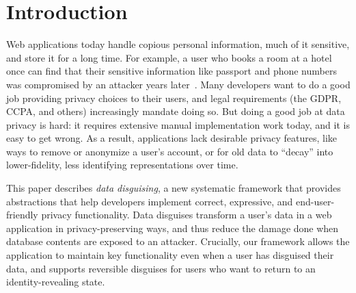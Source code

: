 \section{Introduction}
\label{s:intro}

%
Web applications today handle copious personal information, much of it
sensitive, and store it for a long time.
%
For example, a user who books a room at a hotel once can find that their
sensitive information like passport and phone numbers was compromised by
an attacker years later~\cite{starwood-hack}.
%
%
Many developers want to do a good job providing privacy choices to their users,
and legal requirements (\eg the GDPR, CCPA, and others) increasingly mandate
doing so.
%
%
But doing a good job at data privacy is hard: it requires extensive manual
implementation work today, and it is easy to get wrong.
%
As a result, applications lack desirable privacy features, like \eg ways to
remove or anonymize a user's account, or for old data to ``decay'' into
lower-fidelity, less identifying representations over time.
%

%
%

%
This paper describes \emph{data disguising}, a new systematic framework that
provides abstractions that help developers implement correct,
expressive, and end-user-friendly privacy functionality.
%
Data disguises transform a user's data in a web application in
privacy-preserving ways, and thus reduce the damage done when database contents
are exposed to an attacker.
%
Crucially, our framework allows the application to maintain key functionality even
when a user has disguised their data, and supports reversible disguises for users
who want to return to an identity-revealing state.
%


